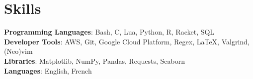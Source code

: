 \documentclass[letterpaper,11pt]{article}
\begin{document}
\section{Skills}
 \begin{itemize}[leftmargin=0.15in, label={}]
    \small{\item{
     \textbf{Programming Languages}{: Bash, C, Lua, Python, R, Racket, SQL} \\
     \textbf{Developer Tools}{: AWS, Git, Google Cloud Platform, Regex, \LaTeX, Valgrind, (Neo)vim} \\
     \textbf{Libraries}{: Matplotlib, NumPy, Pandas, Requests, Seaborn} \\
    \textbf{Languages}{: English, French}
    }}
 \end{itemize}
\end{document}
